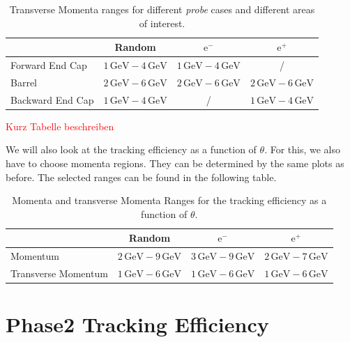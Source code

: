 \documentclass[a4paper,11pt,twosided,final,german,openbib,pdftex,listof=totoc,bibliography=totoc]{scrbook}
\begin{document}
\begin{table}[h!]
	\centering
	\begin{tabular}{lccc}
		&Random&$\textrm{e}^-$ &$\textrm{e}^+$\\
		\hline
		Forward End Cap &$1\,\textrm{GeV} - 4\,\textrm{GeV}$&$1\,\textrm{GeV} - 4\,\textrm{GeV}$&/\\
		Barrel &$2\,\textrm{GeV} - 6\,\textrm{GeV}$&$2\,\textrm{GeV} - 6\,\textrm{GeV}$&$2\,\textrm{GeV} - 6\,\textrm{GeV}$\\
		Backward End Cap &$1\,\textrm{GeV} - 4\,\textrm{GeV}$& /&$1\,\textrm{GeV} - 4\,\textrm{GeV}$\\
	\end{tabular}
	
	\caption[Areas Of Interest Different Transverse Momenta Ranges]{Transverse Momenta ranges for different \textit{probe} cases and different areas of interest.}
	\label{tab:RTPtMDTable}
\end{table}


\textcolor{red}{Kurz Tabelle beschreiben}





We will also look at the tracking efficiency as a function of $\theta$. For this, we also have to choose momenta regions. They can be determined by the same plots as before.
The selected ranges can be found in the following table.

\begin{table}[h!]
	\centering
	\begin{tabular}{lccc}
		&Random&$\textrm{e}^-$ &$\textrm{e}^+$\\
		\hline
		Momentum &$2\,\textrm{GeV} - 9\,\textrm{GeV}$&$3\,\textrm{GeV} - 9\,\textrm{GeV}$&$2\,\textrm{GeV} - 7\,\textrm{GeV}$\\
		Transverse Momentum &$1\,\textrm{GeV} - 6\,\textrm{GeV}$&$1\,\textrm{GeV} - 6\,\textrm{GeV}$&$1\,\textrm{GeV} - 6\,\textrm{GeV}$\\

	\end{tabular}
	
	\caption[Different (Transverse-) Momenta Ranges For Theta Efficiency]{Momenta and transverse Momenta Ranges for the tracking efficiency as a function of $\theta$.}
	\label{tab:RTPMDThetaTable}
\end{table}




\chapter{Phase2 Tracking Efficiency}
\label{chp:TrackingEfficiencyPhase2}
\end{document}
